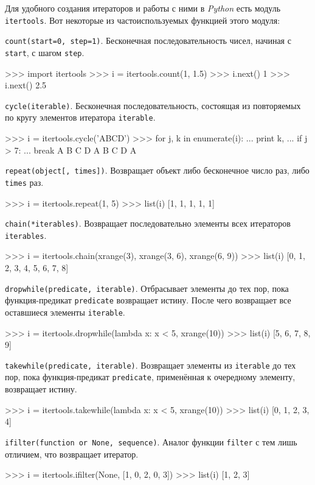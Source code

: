 Для удобного создания итераторов и работы с ними в \emph{Python} есть модуль \lstinline{itertools}. Вот некоторые из частоиспользуемых функцией этого модуля:

\lstinline{count(start=0, step=1)}. Бесконечная последовательность чисел, начиная с \lstinline{start}, с шагом \lstinline{step}.
\begin{pylst}{}{}
>>> import itertools
>>> i = itertools.count(1, 1.5)
>>> i.next()
1
>>> i.next()
2.5
\end{pylst}

\lstinline{cycle(iterable)}. Бесконечная последовательность, состоящая из повторяемых по кругу элементов итератора \lstinline{iterable}.
\begin{pylst}{}{}
>>> i = itertools.cycle('ABCD')
>>> for j, k in enumerate(i):
...     print k,
...     if j > 7:
...         break
A B C D A B C D A
\end{pylst}

\lstinline{repeat(object[, times])}. Возвращает объект либо бесконечное число раз, либо \lstinline{times} раз.
\begin{pylst}{}{}
>>> i = itertools.repeat(1, 5)
>>> list(i)
[1, 1, 1, 1, 1]
\end{pylst}

\lstinline{chain(*iterables)}. Возвращает последовательно элементы всех итераторов \lstinline{iterables}.
\begin{pylst}{}{}
>>> i = itertools.chain(xrange(3), xrange(3, 6), xrange(6, 9))
>>> list(i)
[0, 1, 2, 3, 4, 5, 6, 7, 8]
\end{pylst}

\lstinline{dropwhile(predicate, iterable)}. Отбрасывает элементы до тех пор, пока функция-предикат \lstinline{predicate} возвращает истину. После чего возвращает все оставшиеся элементы \lstinline{iterable}.
\begin{pylst}{}{}
>>> i = itertools.dropwhile(lambda x: x < 5, xrange(10))
>>> list(i)
[5, 6, 7, 8, 9]
\end{pylst}

\lstinline{takewhile(predicate, iterable)}. Возвращает элементы из \lstinline{iterable} до тех пор, пока функция-предикат \lstinline{predicate}, применённая к очередному элементу, возвращает истину.
\begin{pylst}{}{}
>>> i = itertools.takewhile(lambda x: x < 5, xrange(10))
>>> list(i)
[0, 1, 2, 3, 4]
\end{pylst}

\lstinline{ifilter(function or None, sequence)}. Аналог функции \lstinline{filter} с тем лишь отличием, что возвращает итератор.
\begin{pylst}{}{}
>>> i = itertools.ifilter(None, [1, 0, 2, 0, 3])
>>> list(i)
[1, 2, 3]
\end{pylst}

